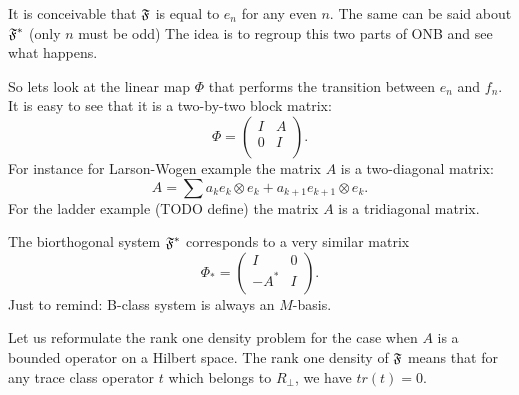 \documentclass[12pt]{amsart}
\theoremstyle{case}
\begin{document}
    \medskip
    It is conceivable that $\mathfrak{F}$ is equal to $e_n$ for any even $n$.
    The same can be said about $\mathfrak{F^{*}}$ (only $n$ must be odd)
    The idea is to regroup this two parts of ONB and see what happens.

    So lets look at the linear map $\Phi$ that performs the transition between ${e_n}$ and ${f_n}$.
    It is easy to see that it is a two-by-two block matrix:
    \[
      \Phi= \left( {
        \begin{array}{cc}
          I & A\\
          0 & I\\
        \end{array}
      }
    \right).
    \]
    For instance for Larson-Wogen example the matrix $A$ is a two-diagonal matrix:
    \[
      A = \sum a_k e_k \otimes e_k + a_{k + 1} e_{k + 1} \otimes e_k.
    \]
    For the ladder example (TODO define) the matrix $A$ is a tridiagonal matrix.

    The biorthogonal system $\mathfrak{F^{*}}$ corresponds to a very similar matrix
    \[
      \Phi_* = \left( {
        \begin{array}{cc}
           I   & 0\\
          -A^* & I\\
        \end{array}
        }
      \right).
    \]
    Just to remind: B-class system is always an $M$-basis.

    Let us reformulate the rank one density problem for the case when $A$ is a bounded operator on a Hilbert space.
    The rank one density of $\mathfrak{F}$ means that for any trace class operator $t$ which belongs to $R_\perp$,
      we have $tr(t) = 0$.
\end{document}
